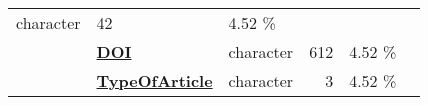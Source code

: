 \documentclass[]{article}
\begin{document}
\begin{longtable}[]{@{}lllrcl@{}}
\begin{minipage}[t]{0.11\columnwidth}
character\strut
\end{minipage} & \begin{minipage}[t]{0.10\columnwidth}\raggedleft\strut
42\strut
\end{minipage} & \begin{minipage}[t]{0.10\columnwidth}\centering\strut
4.52 \%\strut
\end{minipage} & \begin{minipage}[t]{0.12\columnwidth}\raggedright\strut
\strut
\end{minipage}\tabularnewline
\begin{minipage}[t]{0.07\columnwidth}\raggedright\strut
\strut
\end{minipage} & \begin{minipage}[t]{0.35\columnwidth}\raggedright\strut
\textbf{\protect\hyperlink{doi}{DOI}}\strut
\end{minipage} & \begin{minipage}[t]{0.11\columnwidth}\raggedright\strut
character\strut
\end{minipage} & \begin{minipage}[t]{0.10\columnwidth}\raggedleft\strut
612\strut
\end{minipage} & \begin{minipage}[t]{0.10\columnwidth}\centering\strut
4.52 \%\strut
\end{minipage} & \begin{minipage}[t]{0.12\columnwidth}\raggedright\strut
\strut
\end{minipage}\tabularnewline
\begin{minipage}[t]{0.07\columnwidth}\raggedright\strut
\strut
\end{minipage} & \begin{minipage}[t]{0.35\columnwidth}\raggedright\strut
\textbf{\protect\hyperlink{typeofarticle}{TypeOfArticle}}\strut
\end{minipage} & \begin{minipage}[t]{0.11\columnwidth}\raggedright\strut
character\strut
\end{minipage} & \begin{minipage}[t]{0.10\columnwidth}\raggedleft\strut
3\strut
\end{minipage} & \begin{minipage}[t]{0.10\columnwidth}\centering\strut
4.52 \%\strut
\end{minipage} & \begin{minipage}[t]{0.12\columnwidth}\raggedright\strut
\strut
\end{minipage}\tabularnewline

\end{longtable}
\end{document}
